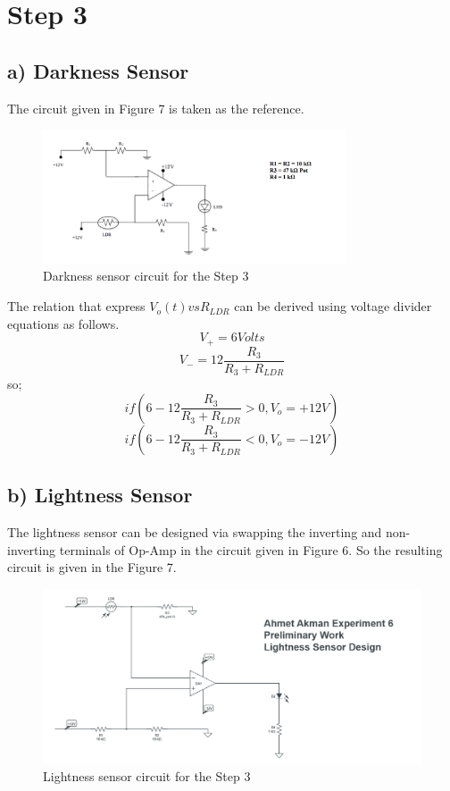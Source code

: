 \documentclass[letterpaper,12pt]{article}
\begin{document}
\section{Step 3}
\subsection{a) Darkness Sensor}
The circuit given in Figure 7 is taken as the reference.
\begin{figure}[H]
	\centering
   \includegraphics[width=0.8\textwidth]{darkness.png}
   \caption{Darkness sensor circuit for the Step 3}
\end{figure} 
The relation that express \(V_o(t) vs R_{LDR}\) can be derived using voltage divider equations as follows.
\[V_+ = 6 Volts
\]\[
V_- = 12\frac{R_3}{R_3+R_{LDR}}
\]
so;
\[ 
if (6-12\frac{R_3}{R_3+R_{LDR}} > 0, V_o = +12V)
\]\[ 
if (6-12\frac{R_3}{R_3+R_{LDR}} < 0, V_o = -12V)
\]
\subsection{b) Lightness Sensor}
The lightness sensor can be designed via swapping the inverting and non-inverting terminals of Op-Amp  in the circuit given in Figure 6. So the resulting circuit is given in the Figure 7.
\begin{figure}[H]
	\centering
   \includegraphics[width=1\textwidth]{lightness.png}
   \caption{Lightness sensor circuit for the Step 3}
\end{figure} 
\end{document}
